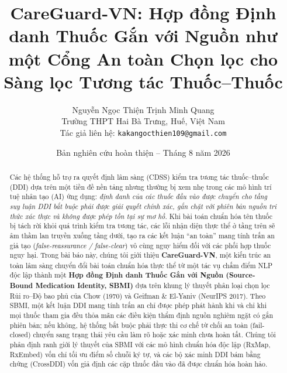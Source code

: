 \documentclass[11pt]{article}
\title{\textbf{CareGuard-VN: Hợp đồng Định danh Thuốc Gắn với Nguồn như một Cổng An toàn Chọn lọc cho Sàng lọc Tương tác Thuốc--Thuốc}}
\author{Nguyễn Ngọc Thiện \qquad Trịnh Minh Quang\\[0.45em]
Trường THPT Hai Bà Trưng, Huế, Việt Nam\\
\small Tác giả liên hệ: \texttt{kakangocthien109@gmail.com}}
\date{Bản nghiên cứu hoàn thiện -- Tháng 8 năm 2026}
\begin{document}
\maketitle

\begin{abstract}
Các hệ thống hỗ trợ ra quyết định lâm sàng (CDSS) kiểm tra tương tác thuốc--thuốc (DDI) dựa trên một tiền đề nền tảng nhưng thường bị xem nhẹ trong các mô hình trí tuệ nhân tạo (AI) ứng dụng: \emph{định danh của các thuốc đầu vào được chuyển cho tầng suy luận DDI bắt buộc phải được giải quyết chính xác, gắn chặt với phiên bản nguồn tri thức xác thực và không được phép tồn tại sự mơ hồ}. Khi bài toán chuẩn hóa tên thuốc bị tách rời khỏi quá trình kiểm tra tương tác, các lỗi nhận diện thực thể ở tầng trên sẽ âm thầm lan truyền xuống tầng dưới, tạo ra các kết luận ``an toàn'' mang tính trấn an giả tạo (\emph{false-reassurance / false-clear}) vô cùng nguy hiểm đối với các phối hợp thuốc nguy hại. Trong bài báo này, chúng tôi giới thiệu \textbf{CareGuard-VN}, một kiến trúc an toàn lâm sàng chuyển đổi bài toán chuẩn hóa thực thể từ một tác vụ chấm điểm NLP độc lập thành một \textbf{Hợp đồng Định danh Thuốc Gắn với Nguồn (Source-Bound Medication Identity, SBMI)} dựa trên khung lý thuyết phân loại chọn lọc Rủi ro--Độ bao phủ của Chow (1970) và Geifman \& El-Yaniv (NeurIPS 2017). Theo SBMI, một kết luận DDI mang tính trấn an chỉ được phép phát hành khi và chỉ khi mọi thuốc tham gia đều thỏa mãn các điều kiện thẩm định nguồn nghiêm ngặt có gắn phiên bản; nếu không, hệ thống bắt buộc phải thực thi cơ chế từ chối an toàn (fail-closed) chuyển sang trạng thái yêu cầu làm rõ hoặc xác minh chưa hoàn tất. Chúng tôi phân định ranh giới lý thuyết của SBMI với các mô hình chuẩn hóa độc lập (RxMap, RxEmbed) vốn chỉ tối ưu điểm số chuỗi ký tự, và các bộ xác minh DDI bám bằng chứng (CrossDDI) vốn giả định các cặp thuốc đầu vào đã được chuẩn hóa hoàn hảo. 

\end{abstract}
\end{document}
